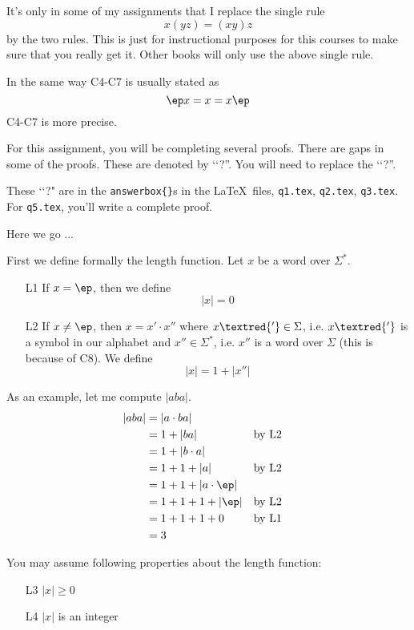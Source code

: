 It's only in some of my assignments that
I replace the single rule
\[
x(yz) = (xy)z
\]
by the two rules.
This is just for instructional purposes for this courses
to make sure that you really get it.
Other books will only use the above single rule.

In the same way C4-C7 is usually stated as
\[
\ep x = x = x \ep
\]
C4-C7 is more precise.

For this assignment, you will be completing several proofs.
There are gaps in some of the proofs.
These are denoted by \lq\lq ?''.
You will need to replace the \lq\lq ?''.

These \lq\lq?" are in the \verb!answerbox{}!s in the \LaTeX\ files,
\verb!q1.tex!, \verb!q2.tex!, \verb!q3.tex!.
For \verb!q5.tex!, you'll write a complete proof.

Here we go ...




\newpage
First we define formally the length function.
Let $x$ be a word over $\Sigma^*$.
\begin{enumerate}
\item[L1] If $x = \ep$, then we define
\[
|x| = 0
\]
\item[L2] If $x \neq \ep$, then $x = x' \cdot x''$ where
$x\textred{'} \in \Sigma$, i.e. $x\textred{'}$ is a symbol in our alphabet
and $x'' \in \Sigma^*$, i.e. $x''$ is a word over $\Sigma$
(this is because of C8).
We define 
\[
|x| = 1 + |x''|
\]
\end{enumerate}
As an example, let me compute $|aba|$.
\begin{align*}
|aba| 
&= |a \cdot ba|                           \\
&= 1 + |ba|              & & \text{by L2} \\
&= 1 + |b \cdot a|       & & \\
&= 1 + 1 + |a|           & & \text{by L2} \\
&= 1 + 1 + |a \cdot \ep| & &              \\
&= 1 + 1 + 1 + |\ep|     & & \text{by L2} \\
&= 1 + 1 + 1 + 0         & & \text{by L1} \\
&= 3 
\end{align*}

You may assume following properties about the length function:
\begin{enumerate}
\item[L3] $|x| \geq 0$
\item[L4] $|x|$ is an integer 
\end{enumerate}

